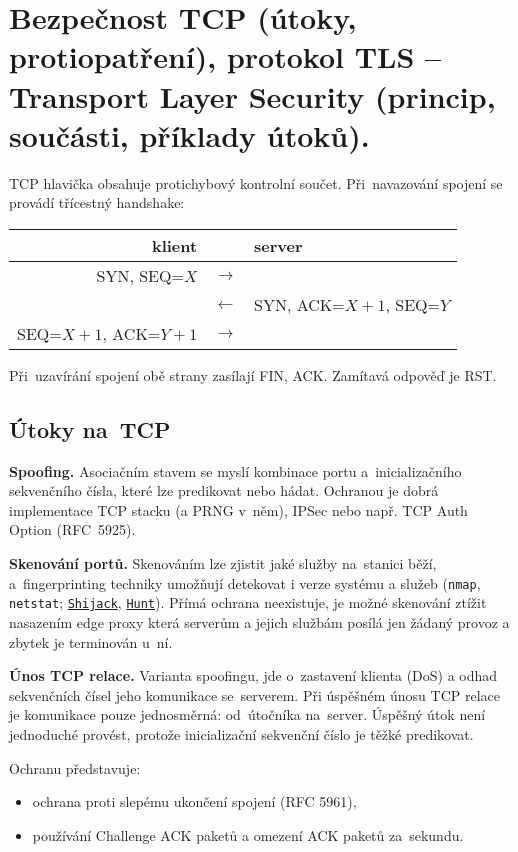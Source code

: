 


\clearpage
\section{Bezpečnost TCP (útoky, protiopatření), protokol TLS -- Transport Layer Security (princip, součásti, příklady útoků).}

TCP hlavička obsahuje protichybový kontrolní součet.
Při~navazování spojení se provádí třícestný handshake:
\begin{center}
\begin{tabular}{rcl}
	klient & & server \\
	\hline
	SYN, SEQ=$X$ & $\rightarrow$ & \\
	& $\leftarrow$ & SYN, ACK=$X+1$, SEQ=$Y$ \\
	SEQ=$X+1$, ACK=$Y+1$ & $\rightarrow$ \\
\end{tabular}
\end{center}
Při~uzavírání spojení obě strany zasílají FIN, ACK.
Zamítavá odpověď je RST.


\subsection{Útoky na~TCP}

\textbf{Spoofing.}
Asociačním stavem se myslí kombinace portu a~inicializačního sekvenčního čísla, které lze predikovat nebo hádat.
Ochranou je dobrá implementace TCP stacku (a PRNG v~něm), IPSec nebo např. TCP Auth Option (RFC~5925).

\textbf{Skenování portů.}
Skenováním lze zjistit jaké služby na~stanici běží, a~fingerprinting techniky umožňují detekovat i verze systému a služeb (\texttt{nmap}, \texttt{netstat}; \href{https://github.com/hackman/shijack}{\texttt{Shijack}}, \href{https://linux.die.net/man/1/hunt}{\texttt{Hunt}}).
Přímá ochrana neexistuje, je možné skenování ztížit nasazením edge proxy která serverům a jejich službám posílá jen žádaný provoz a zbytek je terminován u~ní.

\textbf{Únos TCP relace.}
Varianta spoofingu, jde o~zastavení klienta (DoS) a odhad sekvenčních čísel jeho komunikace se~serverem.
Při úspěšném únosu TCP relace je komunikace pouze jednosměrná: od~útočníka na~server.
Úspěšný útok není jednoduché provést, protože inicializační sekvenční číslo je těžké predikovat. 

Ochranu představuje:
\vspace*{-0.5em}\begin{itemize}
    \item ochrana proti slepému ukončení spojení (RFC 5961),
    \item používání Challenge ACK paketů a omezení ACK paketů za~sekundu.
\end{itemize}


